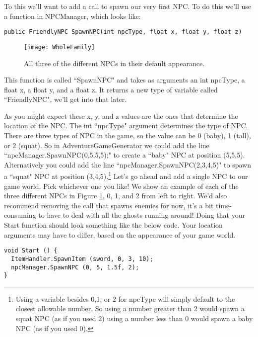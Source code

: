 \documentclass{article}
\begin{document}
To this we'll want to add a call to spawn our very first NPC. To do this we'll use a function in NPCManager, which looks like: 

\lstset{style=sharpc}
\begin{lstlisting}
public FriendlyNPC SpawnNPC(int npcType, float x, float y, float z)
\end{lstlisting}
\begin{figure}
  \texttt{[image: WholeFamily]}
  \caption{All three of the different NPCs in their default appearance.}
  \label{fig:WholeFamily}
\end{figure}

This function is called ``SpawnNPC" and takes as arguments an int npcType, a float x, a float y, and a float z. It returns a new type of variable called ``FriendlyNPC", we'll get into that later. 

As you might expect these x, y, and z values are the ones that determine the location of the NPC. The int ``npcType" argument determines the type of NPC. There are three types of NPC in the game, so the value can be 0 (baby), 1 (tall), or 2 (squat). So in AdventureGameGenerator we could add the line ``npcManager.SpawnNPC(0,5,5,5);" to create a ``baby" NPC at position (5,5,5). Alternatively you could add the line ``npcManager.SpawnNPC(2,3,4,5)" to spawn a ``squat" NPC at position (3,4,5).\footnote{Using a variable besides 0,1, or 2 for npcType will simply default to the closest allowable number. So using a number greater than 2 would spawn a squat NPC (as if you used 2) using a number less than 0 would spawn a baby NPC (as if you used 0).} Let's go ahead and add a single NPC to our game world. Pick whichever one you like! We show an example of each of the three different NPCs in Figure \ref{fig:WholeFamily}, 0, 1, and 2 from left to right. We'd also recommend removing the call that spawns enemies for now, it's a bit time-consuming to have to deal with all the ghosts running around! Doing that your Start function should look something like the below code. Your location arguments may have to differ, based on the appearance of your game world.

\lstset{style=sharpc}
\begin{lstlisting}
void Start () {
  ItemHandler.SpawnItem (sword, 0, 3, 10);
  npcManager.SpawnNPC (0, 5, 1.5f, 2);
}
\end{lstlisting}

\noindent{}
\end{document}
